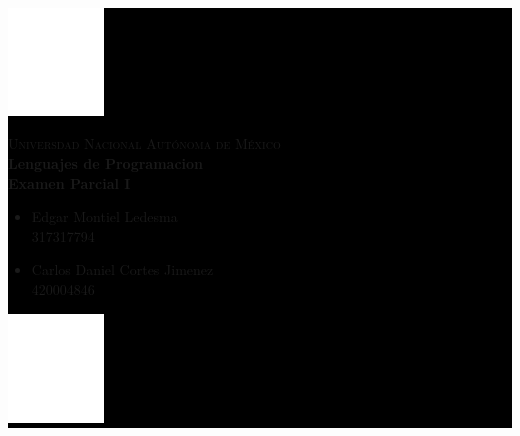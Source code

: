 \documentclass{article}
\begin{document}
\pagecolor{black}
\color{white}

    \colorbox{black}{
        \begin{minipage}[t]{0.16 \textwidth}
           \begin{flushright}
            \includegraphics[width=1in]{UNAM.png}
           \end{flushright}
        \end{minipage}
        \begin{minipage}[H]{0.62 \textwidth}
            \begin{center}
                {\large \textsc{Universdad Nacional Autónoma de México}}
                \vspace{0.25cm}
                \\
                { \large \textbf{Lenguajes de Programacion\\ Examen Parcial I}}                
                \textbf{}
                \begin{multicols}{2}
                \begin{flushleft}
                \begin{itemize}
                    \item  \small Edgar Montiel Ledesma\\ 317317794
    
                    \item \footnotesize Carlos Daniel Cortes Jimenez\\ 420004846
                \end{itemize}
                \end{flushleft}
                \vspace{0.25cm}
                \end{multicols} 
            \end{center}
            \vspace{0.05cm}
        \end{minipage}
        \begin{minipage}[t]{0.16 \textwidth}
            \begin{flushleft}
                \includegraphics[width=1in]{EFC.png}
            \end{flushleft}
        \end{minipage}
    }
    
\end{document}
